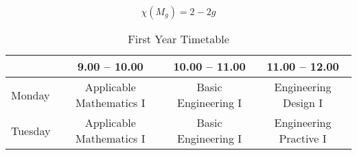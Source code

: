 \documentclass{paper}
\begin{document}
\begin{equation}
\chi(M_g) = 2-2g
\end{equation}

\begin{table}[here]
  \begin{tabular}{|l|c|c|c|}
  \hline
        & 9.00 -- 10.00 & 10.00 -- 11.00 & 11.00 -- 12.00 \\ \hline 
Monday  & Applicable Mathematics I & Basic Engineering I
        & Engineering Design I \\ \hline
Tuesday & Applicable Mathematics I & Basic Engineering I
        & Engineering Practive I \\ \hline
  \end{tabular}
  \caption{First Year Timetable}
\label{poop}
\end{table}
\end{document}

